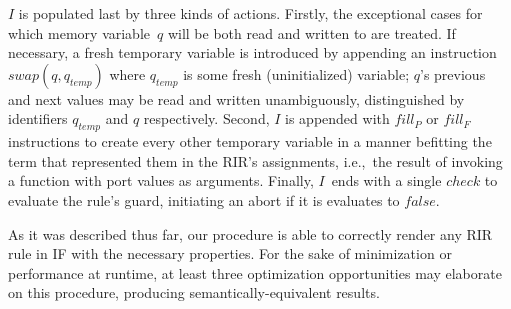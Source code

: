 $I$ is populated last by three kinds of actions. Firstly, the exceptional cases for which memory variable~$q$ will be both read and written to are treated. If necessary, a fresh temporary variable is introduced by appending an instruction $swap(q, q_{temp})$ where $q_{temp}$ is some fresh (uninitialized) variable; $q$'s previous and next values may be read and written unambiguously, distinguished by identifiers $q_{temp}$ and $q$ respectively. Second, $I$ is appended with $fill_P$ or $fill_F$ instructions to create every other temporary variable in a manner befitting the term that represented them in the RIR's assignments, i.e.,\ the result of invoking a function with port values as arguments. Finally, $I$~ends with a single $check$ to evaluate the rule's guard, initiating an abort if it is evaluates to $false$.

As it was described thus far, our procedure is able to correctly render any RIR rule in IF with the necessary properties. For the sake of minimization or performance at runtime, at least three optimization opportunities may elaborate on this procedure, producing semantically-equivalent results.

